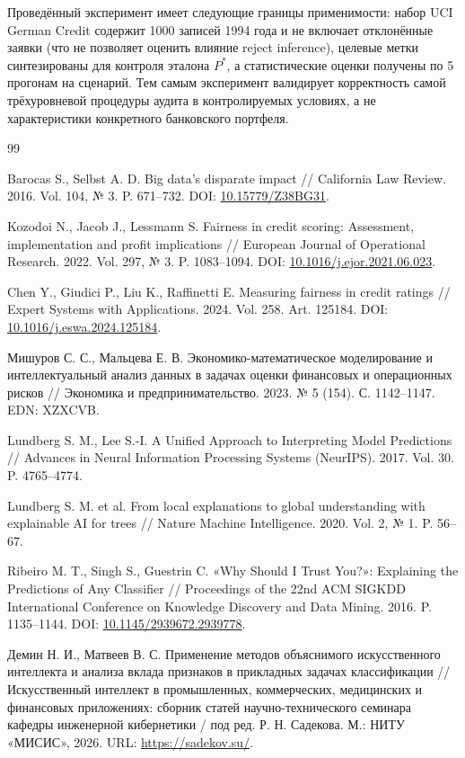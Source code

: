 \documentclass{misisarticle}
\begin{document}
Проведённый эксперимент имеет следующие границы применимости: набор UCI German Credit содержит 1000 записей 1994 года и не включает отклонённые заявки (что не позволяет оценить влияние reject inference), целевые метки синтезированы для контроля эталона $P^*$, а статистические оценки получены по 5 прогонам на сценарий. Тем самым эксперимент валидирует корректность самой трёхуровневой процедуры аудита в контролируемых условиях, а не характеристики конкретного банковского портфеля.

\begin{thebibliography}{99}
\raggedright

Barocas S., Selbst A. D. Big data's disparate impact // California Law Review. 2016. Vol. 104, № 3. P. 671--732. DOI: \url{10.15779/Z38BG31}.

Kozodoi N., Jacob J., Lessmann S. Fairness in credit scoring: Assessment, implementation and profit implications // European Journal of Operational Research. 2022. Vol. 297, № 3. P. 1083--1094. DOI: \url{10.1016/j.ejor.2021.06.023}.

Chen Y., Giudici P., Liu K., Raffinetti E. Measuring fairness in credit ratings // Expert Systems with Applications. 2024. Vol. 258. Art. 125184. DOI: \url{10.1016/j.eswa.2024.125184}.

Мишуров С. С., Мальцева Е. В. Экономико-математическое моделирование и интеллектуальный анализ данных в задачах оценки финансовых и операционных рисков // Экономика и предпринимательство. 2023. № 5 (154). С. 1142--1147. EDN: XZXCVB.

Lundberg S. M., Lee S.-I. A Unified Approach to Interpreting Model Predictions // Advances in Neural Information Processing Systems (NeurIPS). 2017. Vol. 30. P. 4765--4774.

Lundberg S. M. et al. From local explanations to global understanding with explainable AI for trees // Nature Machine Intelligence. 2020. Vol. 2, № 1. P. 56--67.

Ribeiro M. T., Singh S., Guestrin C. «Why Should I Trust You?»: Explaining the Predictions of Any Classifier // Proceedings of the 22nd ACM SIGKDD International Conference on Knowledge Discovery and Data Mining. 2016. P. 1135--1144. DOI: \url{10.1145/2939672.2939778}.

Демин Н. И., Матвеев В. С. Применение методов объяснимого искусственного интеллекта и анализа вклада признаков в прикладных задачах классификации // Искусственный интеллект в промышленных, коммерческих, медицинских и финансовых приложениях: сборник статей научно-технического семинара кафедры инженерной кибернетики / под ред. Р. Н. Садекова. М.: НИТУ «МИСИС», 2026. URL: \url{https://sadekov.su/}.


\end{thebibliography}
\end{document}
